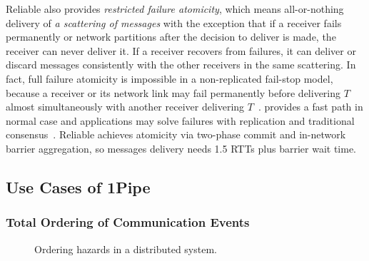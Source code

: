 Reliable \sys{} also provides \emph{restricted failure atomicity}, which means all-or-nothing delivery of \emph{a scattering of messages} with the exception that if a receiver fails permanently or network partitions after the decision to deliver is made, the receiver can never deliver it.
If a receiver recovers from failures, it can deliver or discard messages consistently with the other receivers in the same scattering.
In fact, full failure atomicity is impossible in a non-replicated fail-stop model, because a receiver or its network link may fail permanently before delivering $T$ almost simultaneously with another receiver delivering $T$~\cite{fischer1985impossibility}.
\sys{} provides a fast path in normal case and applications may solve failures with replication and traditional consensus~\cite{lamport1998part,raft}.
Reliable \sys{} achieves atomicity via two-phase commit and in-network barrier aggregation, so messages delivery needs 1.5 RTTs plus barrier wait time.

\subsection{Use Cases of 1Pipe}
\label{subsec:application}

\subsubsection{Total Ordering of Communication Events}
\label{subsec:order-hazards}

\begin{figure}[t]
\centering
    \hspace{0.02\textwidth}
	\caption{Ordering hazards in a distributed system.}
	\label{fig:ordering}
\end{figure}


